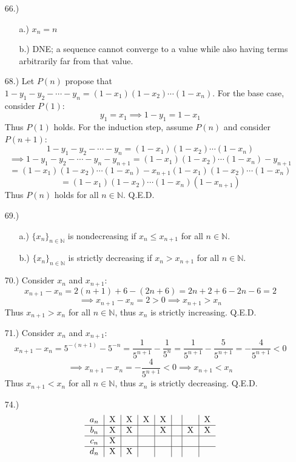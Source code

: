 \documentclass[12pt]{article}
\begin{document}
\begin{itemize}
    \item [66.)] \begin{itemize}
        \item [a.)] $x_n=n$

        \item [b.)] DNE; a sequence cannot converge to a value while also having terms arbitrarily far from that value.
    \end{itemize}

    \item [68.)] Let $P(n)$ propose that $1-y_1-y_2-\cdots-y_n=(1-x_1)(1-x_2)\cdots(1-x_n)$. For the base case, consider $P(1)$:
    \[y_1=x_1\implies1-y_1=1-x_1\]
    Thus $P(1)$ holds. For the induction step, assume $P(n)$ and consider $P(n+1)$:
    \[1-y_1-y_2-\cdots-y_n=(1-x_1)(1-x_2)\cdots(1-x_n)\]
    \[\implies1-y_1-y_2-\cdots-y_n-y_{n+1}=(1-x_1)(1-x_2)\cdots(1-x_n)-y_{n+1}\]
    \[=(1-x_1)(1-x_2)\cdots(1-x_n)-x_{n+1}(1-x_1)(1-x_2)\cdots(1-x_n)\]
    \[=(1-x_1)(1-x_2)\cdots(1-x_n)(1-x_{n+1})\]
    Thus $P(n)$ holds for all $n\in\mathbb{N}$. Q.E.D.

    \item [69.)] \begin{itemize}
        \item [a.)] $\{x_n\}_{n\in\mathbb{N}}$ is nondecreasing if $x_n\leq x_{n+1}$ for all $n\in\mathbb{N}$.

        \item [b.)] $\{x_n\}_{n\in\mathbb{N}}$ is strictly decreasing if $x_n>x_{n+1}$ for all $n\in\mathbb{N}$.
    \end{itemize}

    \item [70.)] Consider $x_n$ and $x_{n+1}$:
    \[x_{n+1}-x_n=2(n+1)+6-(2n+6)=2n+2+6-2n-6=2\]
    \[\implies x_{n+1}-x_n=2>0\implies x_{n+1}>x_n\]
    Thus $x_{n+1}>x_n$ for all $n\in\mathbb{N}$, thus $x_n$ is strictly increasing. Q.E.D.

    \item [71.)] Consider $x_n$ and $x_{n+1}$:
    \[x_{n+1}-x_n=5^{-(n+1)}-5^{-n}=\frac{1}{5^{n+1}}-\frac{1}{5^n}=\frac{1}{5^{n+1}}-\frac{5}{5^{n+1}}=-\frac{4}{5^{n+1}}<0\]
    \[\implies x_{n+1}-x_n=-\frac{4}{5^{n+1}}<0\implies x_{n+1}<x_n\]
    Thus $x_{n+1}<x_n$ for all $n\in\mathbb{N}$, thus $x_n$ is strictly decreasing. Q.E.D.

    \item [74.)] 
    \[
    \begin{tabular}{c|c|c|c|c|c|c|c}
        $a_n$ & X & X & X & X & & & X \\
        \hline
        $b_n$ & X & X & & X & & X & X \\
        \hline
        $c_n$ & X & & & & & & \\
        \hline
        $d_n$ & X & X & & & & & \\
    \end{tabular}
    \]


\end{itemize}
\end{document}
